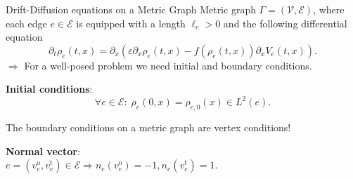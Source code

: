 \documentclass[9pt]{beamer}
\begin{document}
\begin{frame}{Drift-Diffusion equations on a Metric Graph}
    Metric graph $\Gamma =  \left( \mathcal{V}, \mathcal{E} \right) $, where each edge $e \in \mathcal{E}$ is equipped with a length $\ell_e > 0$ and the following differential equation
    \begin{equation*} 
        \partial_t \rho_e  \left( t,x \right)  = \partial_x  \left( \varepsilon \partial_x \rho_e  \left( t,x \right)  - f \left( \rho_e  \left( t,x \right)   \right)  \partial_x V_e  \left( t,x \right)  \right).
    \end{equation*}
    $\Rightarrow$ For a well-posed problem we need initial and boundary conditions.

    \vspace{5mm}

    \textbf{Initial conditions}:
    \begin{equation*}
        \forall e \in \mathcal{E} \colon \; \rho_e \left( 0,x \right)  = \rho_{e, 0} \left( x \right) \in L^2 \left( e \right).
    \end{equation*}

    \vspace{3mm}

    The boundary conditions on a metric graph are vertex conditions!

    \vspace{3mm}

    \textbf{Normal vector}: \\
    $e = \left( v^{\operatorname{o}}_e, v^{\operatorname{t}}_e \right) \in \mathcal{E} \Rightarrow n_e \left( v^{\operatorname{o}}_e \right)  = -1, n_e \left( v^{\operatorname{t}}_e \right)  = 1$. \\

\end{frame}
\end{document}
